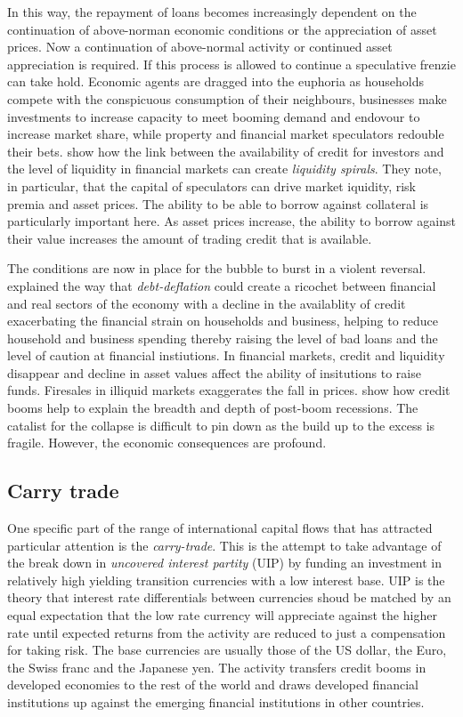 \documentclass[12pt, a4paper, oneside]{article} %
\begin{document}
In this way, the repayment of loans becomes increasingly dependent on the continuation of above-norman economic conditions or the appreciation of asset prices. Now a continuation of above-normal activity or continued asset appreciation is required. If this process is allowed to continue a speculative frenzie can take hold.  Economic agents are dragged into the euphoria as households compete with the conspicuous consumption of their neighbours, businesses make investments to increase capacity to meet booming demand and endovour to increase market share, while property and financial market speculators redouble their bets.  \citet{BrunnermeierLiquidity} show how the link between the availability of credit for investors and the level of liquidity in financial markets can create \emph{liquidity spirals}.   They note, in particular, that the capital of speculators can drive market iquidity, risk premia and asset prices.  The ability to be able to borrow against collateral is particularly important here.  As asset prices increase, the ability to borrow against their value increases the amount of trading credit that is available.  

The conditions are now in place for the bubble to burst in a violent reversal.  \citet{FisherBD, FisherDD} explained the way that \emph{debt-deflation} could create a ricochet between financial and real sectors of the economy with a decline in the availablity of credit exacerbating the financial strain on households and business, helping to reduce household and business spending thereby raising the level of bad loans and the level of caution at financial instiutions. In financial markets, credit and liquidity disappear and decline in asset values affect the ability of insitutions to raise funds.  Firesales in illiquid markets exaggerates the fall in prices. \citet{ReinhartRogoff} show how credit booms help to explain the breadth and depth of post-boom recessions.  The catalist for the collapse is difficult to pin down as the build up to the excess is fragile.  However, the economic consequences are profound.  

\subsection{Carry trade}
One specific part of the range of international capital flows that has attracted particular attention is the \emph{carry-trade}.  This is the attempt to take advantage of the break down in \emph{uncovered interest partity} (UIP) by funding an investment in relatively high yielding transition currencies with a low interest base.  UIP is the theory that interest rate differentials between currencies shoud be matched by an equal expectation that the low rate currency will appreciate against the higher rate until expected returns from the activity are reduced to just a compensation for taking risk. The base currencies are usually those of the US dollar, the Euro, the Swiss franc and the Japanese yen.  The activity transfers credit booms in developed economies to the rest of the world and draws developed financial institutions up against the emerging financial institutions in other countries.  
\end{document}
